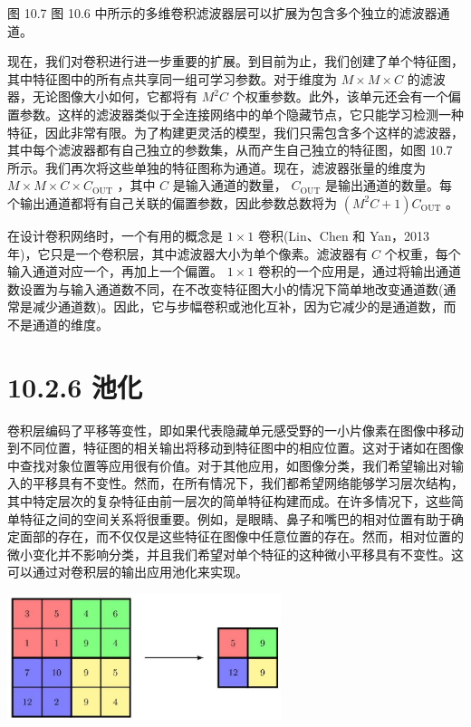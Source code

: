\documentclass[10pt]{report}
\begin{document}
图 10.7 图 10.6 中所示的多维卷积滤波器层可以扩展为包含多个独立的滤波器通道。

现在，我们对卷积进行进一步重要的扩展。到目前为止，我们创建了单个特征图，其中特征图中的所有点共享同一组可学习参数。对于维度为 \(M \times  M \times  C\) 的滤波器，无论图像大小如何，它都将有 \({M}^{2}C\) 个权重参数。此外，该单元还会有一个偏置参数。这样的滤波器类似于全连接网络中的单个隐藏节点，它只能学习检测一种特征，因此非常有限。为了构建更灵活的模型，我们只需包含多个这样的滤波器，其中每个滤波器都有自己独立的参数集，从而产生自己独立的特征图，如图 10.7 所示。我们再次将这些单独的特征图称为通道。现在，滤波器张量的维度为 \(M \times  M \times  C \times  {C}_{\mathrm{{OUT}}}\) ，其中 \(C\) 是输入通道的数量， \({C}_{\mathrm{{OUT}}}\) 是输出通道的数量。每个输出通道都将有自己关联的偏置参数，因此参数总数将为 \(\left( {{M}^{2}C + 1}\right) {C}_{\mathrm{{OUT}}}\) 。

在设计卷积网络时，一个有用的概念是 \(1 \times  1\) 卷积(Lin、Chen 和 Yan，2013 年)，它只是一个卷积层，其中滤波器大小为单个像素。滤波器有 \(C\) 个权重，每个输入通道对应一个，再加上一个偏置。 \(1 \times  1\) 卷积的一个应用是，通过将输出通道数设置为与输入通道数不同，在不改变特征图大小的情况下简单地改变通道数(通常是减少通道数)。因此，它与步幅卷积或池化互补，因为它减少的是通道数，而不是通道的维度。

\section*{10.2.6 池化}

卷积层编码了平移等变性，即如果代表隐藏单元感受野的一小片像素在图像中移动到不同位置，特征图的相关输出将移动到特征图中的相应位置。这对于诸如在图像中查找对象位置等应用很有价值。对于其他应用，如图像分类，我们希望输出对输入的平移具有不变性。然而，在所有情况下，我们都希望网络能够学习层次结构，其中特定层次的复杂特征由前一层次的简单特征构建而成。在许多情况下，这些简单特征之间的空间关系将很重要。例如，是眼睛、鼻子和嘴巴的相对位置有助于确定面部的存在，而不仅仅是这些特征在图像中任意位置的存在。然而，相对位置的微小变化并不影响分类，并且我们希望对单个特征的这种微小平移具有不变性。这可以通过对卷积层的输出应用池化来实现。

\begin{center}
\includegraphics[max width=0.6\textwidth]{images/0194e279-9b28-703a-88f4-c3ac21e2010d_316_755_345_798_367_0.jpg}
\end{center}
\hspace*{3em} 
\end{document}
